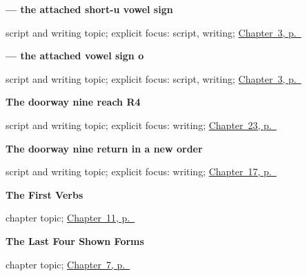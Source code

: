 \noindent\begin{minipage}[t]{\linewidth}
\raggedright
\textbf{ — the attached short-u vowel sign}\par
\footnotesize script and writing topic; explicit focus: script, writing; \hyperref[ch:gu-doorway-forms]{Chapter~3, p.~\pageref*{ch:gu-doorway-forms}}
\end{minipage}\par\smallskip

\noindent\begin{minipage}[t]{\linewidth}
\raggedright
\textbf{ — the attached vowel sign o}\par
\footnotesize script and writing topic; explicit focus: script, writing; \hyperref[ch:gu-doorway-forms]{Chapter~3, p.~\pageref*{ch:gu-doorway-forms}}
\end{minipage}\par\smallskip

\noindent\begin{minipage}[t]{\linewidth}
\raggedright
\textbf{The doorway nine reach R4}\par
\footnotesize script and writing topic; explicit focus: writing; \hyperref[ch:gu-doorway-r4]{Chapter~23, p.~\pageref*{ch:gu-doorway-r4}}
\end{minipage}\par\smallskip

\noindent\begin{minipage}[t]{\linewidth}
\raggedright
\textbf{The doorway nine return in a new order}\par
\footnotesize script and writing topic; explicit focus: writing; \hyperref[ch:gu-friend-and-family]{Chapter~17, p.~\pageref*{ch:gu-friend-and-family}}
\end{minipage}\par\smallskip

\noindent\begin{minipage}[t]{\linewidth}
\raggedright
\textbf{The First Verbs}\par
\footnotesize chapter topic; \hyperref[ch:first-verbs]{Chapter~11, p.~\pageref*{ch:first-verbs}}
\end{minipage}\par\smallskip

\noindent\begin{minipage}[t]{\linewidth}
\raggedright
\textbf{The Last Four Shown Forms}\par
\footnotesize chapter topic; \hyperref[ch:gu-final-script-closure-b]{Chapter~7, p.~\pageref*{ch:gu-final-script-closure-b}}
\end{minipage}\par\smallskip

